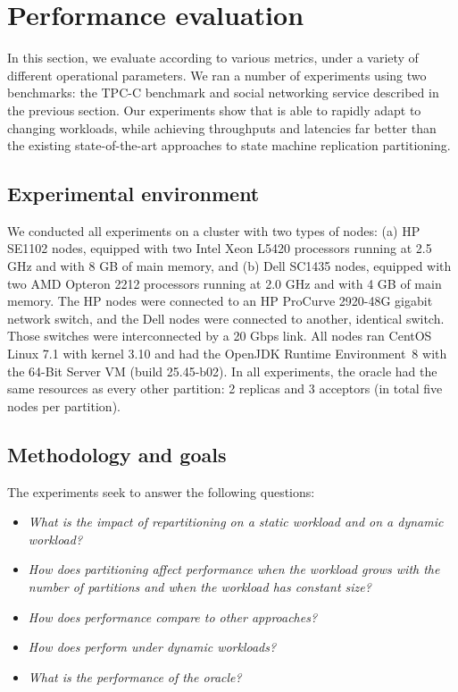 \section{Performance evaluation}
\label{sec:experiments}

In this section, we evaluate \dynastar{} according to various metrics,
under a variety of different operational parameters.
We ran a number of experiments using two benchmarks: the TPC-C benchmark and
\appname{} social networking service described in the previous section.
Our experiments show that \dynastar{} is able to rapidly adapt to changing 
workloads, while achieving throughputs and latencies far better than the existing
state-of-the-art approaches to state machine replication partitioning.


\subsection{Experimental environment}
\label{sec:evaluation:setup}

We conducted all experiments on a cluster with two types of nodes: (a)
HP SE1102 nodes, equipped with two Intel Xeon L5420 processors running
at 2.5 GHz and with 8 GB of main memory, and (b) Dell SC1435 nodes,
equipped with two AMD Opteron 2212 processors running at 2.0 GHz and
with 4 GB of main memory. The HP nodes were connected to an HP
ProCurve 2920-48G gigabit network switch, and the Dell nodes were
connected to another, identical switch. Those switches were
interconnected by a 20 Gbps link.  All nodes ran CentOS Linux 7.1 with
kernel 3.10 and had the OpenJDK Runtime Environment~8 with the
\mbox{64-Bit} Server VM (build 25.45-b02). In all experiments, the oracle 
had the same resources as every other partition: 2 replicas and 3 acceptors 
(in total five nodes per partition).


\subsection{Methodology and goals}
\label{sec:evaluation:methodology}

The experiments seek to answer the following questions:
\begin{itemize}
\item \emph{What is the impact of repartitioning on a static workload and on a dynamic workload?}
\item \emph{How does partitioning affect performance when the workload grows with the number of partitions and when the workload has constant size?}
\item \emph{How does \dynastar performance compare to other approaches?} 
\item \emph{How does \dynastar perform under dynamic workloads?}
\item \emph{What is the performance of the oracle?}
\end{itemize}

